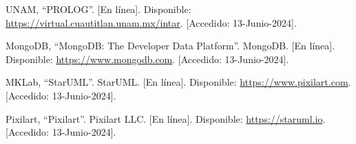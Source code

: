 \documentclass[12pt,twoside]{article}
\begin{document}
\begin{thebibliography}{10}
	UNAM, ``PROLOG''. [En línea]. Disponible: \url{https://virtual.cuautitlan.unam.mx/intar}. [Accedido: 13-Junio-2024].
	
	MongoDB, ``MongoDB: The Developer Data Platform''. MongoDB. [En línea]. Disponible: \url{https://www.mongodb.com}. [Accedido: 13-Junio-2024].
	
	MKLab, ``StarUML''. StarUML. [En línea]. Disponible: \url{https://www.pixilart.com}. [Accedido: 13-Junio-2024].
	
	Pixilart, ``Pixilart''. Pixilart LLC. [En línea]. Disponible: \url{https://staruml.io}. [Accedido: 13-Junio-2024].
	

	\end{thebibliography}
	
\end{document}
